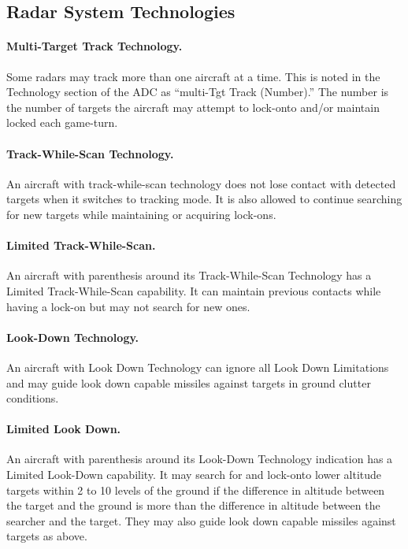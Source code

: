 \begin{advancedrules}

\section{Radar System Technologies}

\paragraph{Multi-Target Track Technology.} Some radars may track more than one aircraft at a time. This is noted in the Technology section of the ADC as “multi-Tgt Track (Number).” The number is the number of targets the aircraft may attempt to lock-onto and/or maintain locked each game-turn.

\paragraph{Track-While-Scan Technology.} An aircraft with track-while-scan technology does not lose contact with detected targets when it switches to tracking mode. It is also allowed to continue searching for new targets while maintaining or acquiring lock-ons.

\paragraph{Limited Track-While-Scan.} An aircraft with parenthesis around its Track-While-Scan Technology has a Limited Track-While-Scan capability. It can maintain previous contacts while having a lock-on but may not search for new ones.

\paragraph{Look-Down Technology.} \label{rule:look-down-missiles}
An aircraft with Look Down Technology can ignore all Look Down Limitations and may guide look down capable missiles against targets in ground clutter conditions.

\paragraph{Limited Look Down.} An aircraft with parenthesis around its Look-Down Technology indication has a Limited Look-Down capability.  It may search for and lock-onto lower altitude targets within 2 to 10 levels of the ground if the difference in altitude between the target and the ground is more than the difference in altitude between the searcher and the target. They may also guide look down capable missiles against targets as above.


\end{advancedrules}
